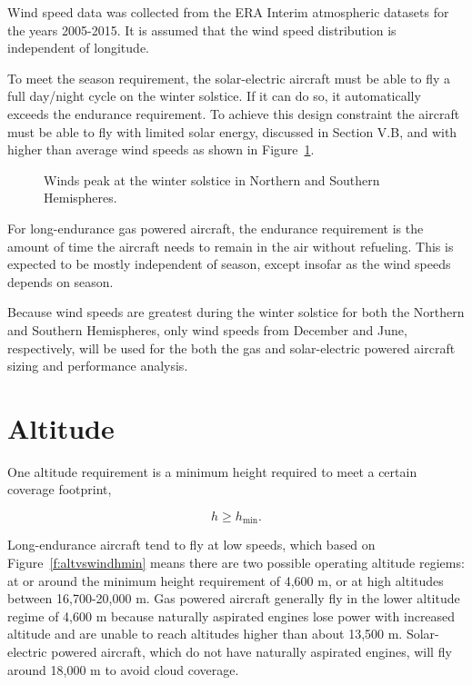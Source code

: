 Wind speed data was collected from the ERA Interim atmospheric datasets for the years 2005-2015.\cite{wind} 
It is assumed that the wind speed distribution is independent of longitude. 

To meet the season requirement, the solar-electric aircraft must be able to fly a full day/night cycle on the winter solstice.  
If it can do so, it automatically exceeds the endurance requirement. 
To achieve this design constraint the aircraft must be able to fly with limited solar energy, discussed in Section V.B, and with higher than average wind speeds as shown in Figure~\ref{f:windvsmonth}.  

\begin{figure}[h!]
 \begin{subfigmatrix}{2}%
 \end{subfigmatrix}
 \caption{Winds peak at the winter solstice in Northern and Southern Hemispheres.\cite{wind}}
 \label{f:windvsmonth}
\end{figure}

For long-endurance gas powered aircraft, the endurance requirement is the amount of time the aircraft needs to remain in the air without refueling.  
This is expected to be mostly independent of season, except insofar as the wind speeds depends on season. 

Because wind speeds are greatest during the winter solstice for both the Northern and Southern Hemispheres, only wind speeds from December and June, respectively, will be used for the both the gas and solar-electric powered aircraft sizing and performance analysis. 

\section{Altitude}

One altitude requirement is a minimum height required to meet a certain coverage footprint,

\begin{equation}
 h \geq h_{\text{min}}.
\end{equation}

Long-endurance aircraft tend to fly at low speeds, which based on Figure~\ref{f:altvswindhmin} means there are two possible operating altitude regiems: at or around the minimum height requirement of 4,600 m, or at high altitudes between 16,700-20,000 m. 
Gas powered aircraft generally fly in the lower altitude regime of 4,600 m because naturally aspirated engines lose power with increased altitude and are unable to reach altitudes higher than about 13,500 m.  
Solar-electric powered aircraft, which do not have naturally aspirated engines, will fly around 18,000 m to avoid cloud coverage.

